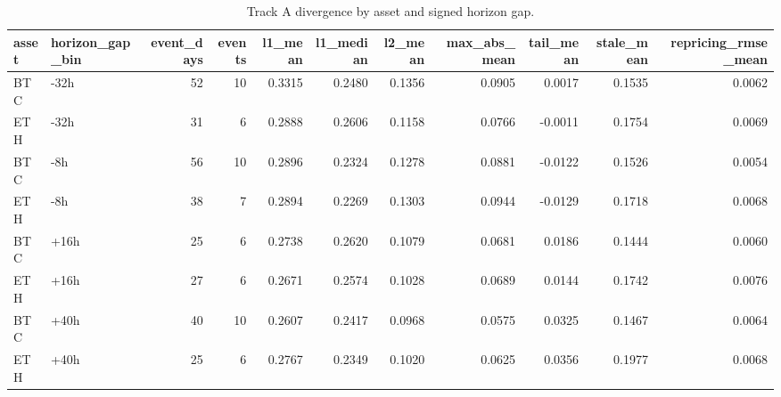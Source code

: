 \begin{table}
\caption{Track A divergence by asset and signed horizon gap.}
\label{tab:trackA_divergence_by_asset_gap}
\begin{tabular}{llrrrrrrrrr}
\toprule
asset & horizon\_gap\_bin & event\_days & events & l1\_mean & l1\_median & l2\_mean & max\_abs\_mean & tail\_mean & stale\_mean & repricing\_rmse\_mean \\
\midrule
BTC & -32h & 52 & 10 & 0.3315 & 0.2480 & 0.1356 & 0.0905 & 0.0017 & 0.1535 & 0.0062 \\
ETH & -32h & 31 & 6 & 0.2888 & 0.2606 & 0.1158 & 0.0766 & -0.0011 & 0.1754 & 0.0069 \\
BTC & -8h & 56 & 10 & 0.2896 & 0.2324 & 0.1278 & 0.0881 & -0.0122 & 0.1526 & 0.0054 \\
ETH & -8h & 38 & 7 & 0.2894 & 0.2269 & 0.1303 & 0.0944 & -0.0129 & 0.1718 & 0.0068 \\
BTC & +16h & 25 & 6 & 0.2738 & 0.2620 & 0.1079 & 0.0681 & 0.0186 & 0.1444 & 0.0060 \\
ETH & +16h & 27 & 6 & 0.2671 & 0.2574 & 0.1028 & 0.0689 & 0.0144 & 0.1742 & 0.0076 \\
BTC & +40h & 40 & 10 & 0.2607 & 0.2417 & 0.0968 & 0.0575 & 0.0325 & 0.1467 & 0.0064 \\
ETH & +40h & 25 & 6 & 0.2767 & 0.2349 & 0.1020 & 0.0625 & 0.0356 & 0.1977 & 0.0068 \\
\bottomrule
\end{tabular}
\end{table}
